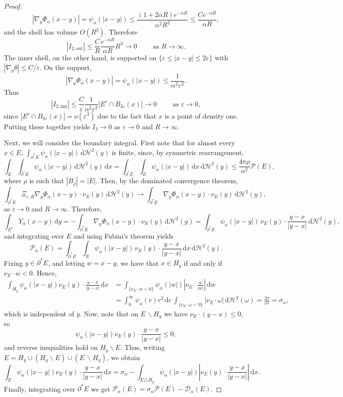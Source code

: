 \documentclass[a4paper,11pt,reqno]{amsart}
\numberwithin{equation}{section}
\theoremstyle{remark}
\theoremstyle{definition}
\newcommand{\e}{\varepsilon}
\newcommand{\dd}{\,\mathrm{d}}
\renewcommand{\setminus}{\backslash}
\newcommand{\asymm}[2]{#1\triangle #2}
\newcommand{\pt}{\partial}
\newcommand{\Htwo}{\mathcal{H}^2}
\renewcommand{\leq}{\leqslant}
\newcommand{\calD}{\mathcal{D}}
\newcommand{\Pe}{\mathcal{P}}
\begin{document}
\begin{proof}
	\[
		|\nabla_y \Phi_\alpha(x-y)| = \psi_\alpha(|x-y|) \leq \frac{(1+2\alpha R)e^{-\alpha R}}{\alpha^2 R^2} \leq \frac{C e^{-\alpha R}}{\alpha R},
	\]
and the shell has volume $O(R^3)$. Therefore
	\[
		|I_{2,\mathrm{out}}| \leq \frac{C}{R} \frac{e^{-\alpha R}}{\alpha R} R^3 \to 0 \qquad \text{ as } R\to \infty.
	\]
The inner shell, on the other hand, is supported on $\{\e \leq |x-y| \leq 2\e\}$ with $|\nabla_y \theta| \leq C/\e$. On the support,
	\[
		|\nabla_y \Phi_\alpha(x-y)| = \psi_\alpha(|x-y|) \leq \frac{1}{\alpha^2 \e^2}.
	\]
Thus
	\[
		|I_{2,\mathrm{inn}}| \leq \frac{C}{\e} \frac{1}{\alpha^2\e^2} |E^c \cap B_{2\e}(x)| \to 0 \qquad \text{ as } \e \to 0,
	\]
since $|E^c \cap B_{2\e}(x)|=o(\e^3)$ due to the fact that $x$ is a point of density one. Putting these together yields $I_2 \to 0$ as $\e\to 0$ and $R\to \infty$.

Next, we will consider the boundary integral. First note that for almost every $x\in E$, $\int_{\pt^* E} \psi_\alpha(|x-y|)\dd \Htwo(y)$ is finite, since, by symmetric rearrangement,
	\[
		\int_E \int_{\pt^* E} \psi_\alpha(|x-y|)\dd \Htwo(y) \dd x = \int_{\pt^* E} \int_E \psi_\alpha(|x-y|)\dd x \dd \Htwo(y) \leq \frac{4\pi\rho}{\alpha^2}\Pe(E),
	\]
where $\rho$ is such that $|B_\rho|=|E|$. Then, by the dominated convergence theorem,
	\[
		\int_{\pt^* E} \Xi_{\e,R} \nabla_y\Phi_\alpha(x-y)\cdot \nu_E(y) \dd \Htwo(y) \to \int_{\pt^* E}  \nabla_y\Phi_\alpha(x-y)\cdot \nu_E(y) \dd \Htwo(y),
	\]
as $\e\to 0$ and $R\to \infty$. Therefore,
	\[
		\int_{E^c} Y_\alpha(x-y)\dd y = -\int_{\pt^* E}\nabla_y\Phi_\alpha(x-y)\cdot \nu_E(y) \dd \Htwo(y)=\int_{\pt^* E} \psi_\alpha(|x-y|)\,\nu_E(y)\cdot\frac{y-x}{|y-x|}\dd \Htwo(y),
	\]
and integrating over $E$ and using Fubini's theorem yields
	\[
		\Pe_\alpha(E)=\int_{\pt^* E}\int_E \psi_\alpha(|x-y|)\,\nu_E(y) \cdot \frac{y-x}{|y-x|}\dd x \dd \Htwo(y).
	\]
Fixing $y\in\pt^* E$, and letting $w=x-y$, we have that $x\in H_y$ if and only if $\nu_E \cdot w <0$. Hence,
	\begin{align*}
		\int_{H_y} \psi_\alpha(|x-y|)\nu_E(y)\cdot \frac{y-x}{|y-x|}\dd x &= \int_{\{\nu_E\cdot w<0\}} \psi_\alpha(|w|) \left|\nu_E \cdot \frac{w}{|w|}\right|\dd w  \\
									&= \int_0^\infty \psi_\alpha(r) r^2 \dd r \, \int_{\{\nu_E\cdot\omega<0\}} |\nu_E\cdot\omega|\dd \Htwo(\omega) = \frac{2\pi}{\alpha^3} = \sigma_\alpha,
	\end{align*}
which is independent of $y$. Now, note that on $E\,\setminus H_y$ we have $\nu_E\cdot(y-x)\leq 0$, so 	
	\[
		\psi_\alpha(|x-y|)\nu_E(y)\cdot \frac{y-x}{|y-x|}\leq 0,
	\]
and reverse inequalities hold on $H_y\setminus E$. Thus, writing $E=H_y\cup (H_y\setminus E) \cup (E\,\setminus H_y)$, we obtain
	\[
		\int_{E} \psi_\alpha(|x-y|)\nu_E(y)\cdot\frac{y-x}{|y-x|}\dd x =\sigma_\alpha - \int_{\asymm{E}{H_y}} \psi_\alpha(|x-y|)\left|\nu_E(y)\cdot\frac{y-x}{|y-x|}\right|\dd x.
	\]
Finally, integrating over $\pt^* E$ we get $\Pe_\alpha(E)=\sigma_\alpha \Pe(E)-\calD_\alpha(E)$.
\end{proof}
\end{document}
